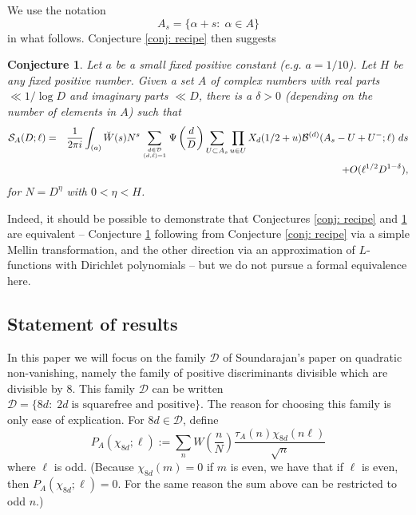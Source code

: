 \documentclass[12pt]{amsart}
\newtheorem{conjecture}{Conjecture}
\begin{document}
	We use the notation
	$$ A_s=\{\alpha+s:\; \alpha \in A\}$$
	in what follows. Conjecture \ref{conj: recipe} then suggests
	
	\begin{conjecture}
		\label{conj: dirichpoly}
		Let $a$ be a small fixed positive constant (e.g. $a = 1/10$). Let $H$ be any fixed positive number. Given a set $A$ of complex numbers with real parts $\ll 1/\log D$ and imaginary parts $\ll D$, there is a $\delta > 0$ (depending on the number of elements in $A$) such that
		\begin{eqnarray*}
			\mathcal S_{A}(D;\ell)&=&\frac{1}{2\pi i}\int_{(a)}\breve{W}(s) N^s
			\sum_{d\in \mathcal D\atop (d,\ell)=1} \Psi\left(\frac dD\right) \sum_{U\subset A_s} \prod_{u\in U} X_d(1/2 +u) \mathcal B^{(d)}(A_s-U+U^-;\ell)~ds\\
			&&\qquad  +O(\ell^{1/2}D^{1-\delta}),
		\end{eqnarray*}
		for $N =  D^\eta$ with $0 < \eta < H$.
	\end{conjecture}
	
	Indeed, it should be possible to demonstrate that Conjectures \ref{conj: recipe} and \ref{conj: dirichpoly} are equivalent -- Conjecture \ref{conj: dirichpoly} following from Conjecture \ref{conj: recipe} via a simple Mellin transformation, and the other direction via an approximation of $L$-functions with Dirichlet polynomials -- but we do not pursue a formal equivalence here.
	
	
	
	\subsection{Statement of results}
	\label{subsec:statement_of_results}
	
	In this paper we will focus on the family $\mathcal D$ of Soundarajan's paper \cite{Sou} on quadratic non-vanishing, namely the family of positive discriminants divisible which are  divisible by $8$. This family $\mathcal{D}$ can be written $\mathcal{D} = \{8d:\; 2d \; \textrm{is squarefree and positive}\}$.  The reason for choosing this family is only ease of explication.
	For $8d \in \mathcal{D}$, define
	$$P_A(\chi_{8d};\ell) := \sum_{n}W\left(\frac n N\right)\frac{\tau_A(n) \chi_{8d}(n\ell)}{\sqrt{n}}$$
	where $\ell$ is odd. (Because $\chi_{8d}(m) = 0$ if $m$ is even, we have that if $\ell$ is even, then $P_A(\chi_{8d};\ell) = 0$. For the same reason the sum above can be restricted to odd $n$.)
	
\end{document}

